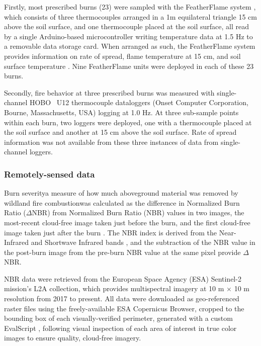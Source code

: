 \documentclass[fire,article,submit,oneauthor,pdftex]{Definitions/mdpi}
\begin{document}
Firstly, most prescribed burns (23) were sampled with the FeatherFlame system \cite{mcgranahan2021}, which consists of three thermocouples arranged in a 1m equilateral triangle 15 cm above the soil surface, and one thermocouple placed at the soil surface, all read by a single Arduino-based microcontroller writing temperature data at 1.5 Hz to a removable data storage card.
When arranged as such, the FeatherFlame system provides information on rate of spread, flame temperature at 15 cm, and soil surface temperature \cite{mcgranahan2022}. 
Nine FeatherFlame units were deployed in each of these 23 burns.

Secondly, fire behavior at three prescribed burns was measured with single-channel HOBO\textregistered~ U12 thermocouple dataloggers (Onset Computer Corporation, Bourne, Massachusetts, USA) logging at 1.0 Hz. 
At three sub-sample points within each burn, two loggers were deployed, one with a thermocouple placed at the soil surface and another at 15 cm above the soil surface. 
Rate of spread information was not available from these three instances of data from single-channel loggers. 

\subsubsection{Remotely-sensed data}

Burn severity\textemdash a measure of how much aboveground material was removed by wildland fire combustion\textemdash was calculated as the difference in Normalized Burn Ratio ($\Delta$NBR) from Normalized Burn Ratio (NBR) values in two images, the most-recent cloud-free image taken just before the burn, and the first cloud-free image taken just after the burn \cite[e.g.,][]{llorens2021}.
The NBR index is derived from the Near-Infrared and Shortwave Infrared bands \cite{key2006a}, and the subtraction of the NBR value in the post-burn image from the pre-burn NBR value at the same pixel provide $\Delta$NBR. 

NBR data were retrieved from the European Space Agency (ESA) Sentinel-2 mission's L2A collection, which provides multispectral imagery at 10 m $\times$ 10 m resolution from 2017 to present. 
All data were downloaded as geo-referenced raster files using the freely-available ESA Copernicus Browser, cropped to the bounding box of each visually-verified perimeter, generated with a custom EvalScript \cite{mcgranahan2025}, following visual inspection of each area of interest in true color images to ensure quality, cloud-free imagery. 
\end{document}

